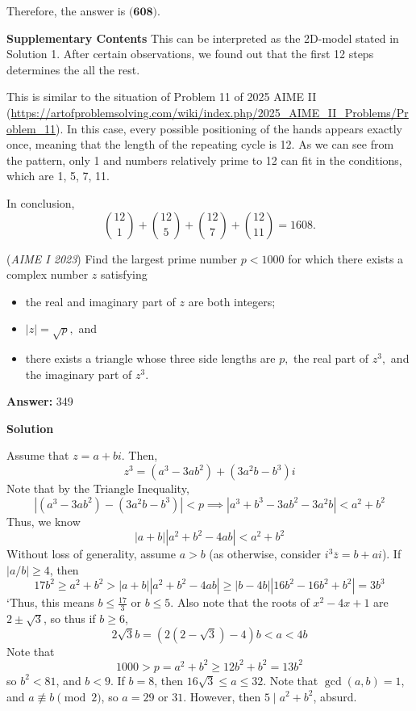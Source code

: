\begin{enumerate}
{{ Therefore, the answer is $\boxed{\textbf{(608)}}$.

 \textbf{Supplementary Contents} This can be interpreted as the 2D-model stated in Solution 1. After certain observations, we found out that the first 12 steps determines the all the rest.

 This is similar to the situation of Problem 11 of 2025 AIME II (\href{https://artofproblemsolving.com/wiki/index.php/2025\_AIME\_II\_Problems/Problem\_11}{https://artofproblemsolving.com/wiki/index.php/2025\_AIME\_II\_Problems/Problem\_11}). In this case, every possible positioning of the hands appears exactly once, meaning that the length of the repeating cycle is 12. As we can see from the pattern, only 1 and numbers relatively prime to 12 can fit in the conditions, which are 1, 5, 7, 11.

 In conclusion,
 \[{12\choose1}+{12\choose5}+{12\choose7}+{12\choose11}=1\boxed{608}.\]



	\item (\textit{AIME I 2023}) Find the largest prime number $p<1000$ for which there exists a complex number $z$ satisfying


 
            \begin{itemize}
        \item the real and imaginary part of $z$ are both integers;
            \end{itemize}
            
            \begin{itemize}
        \item $|z|=\sqrt{p},$ and
            \end{itemize}
            
            \begin{itemize}
        \item there exists a triangle whose three side lengths are $p,$ the real part of $z^{3},$ and the imaginary part of $z^{3}.$
            \end{itemize}
            
 \textbf{Answer: }349



\textbf{Solution}

Assume that $z=a+bi$. Then,
 \[z^3=(a^3-3ab^2)+(3a^2b-b^3)i\]Note that by the Triangle Inequality,
 \[|(a^3-3ab^2)-(3a^2b-b^3)|<p\implies |a^3+b^3-3ab^2-3a^2b|<a^2+b^2\]Thus, we know
 \[|a+b||a^2+b^2-4ab|<a^2+b^2\]Without loss of generality, assume $a>b$ (as otherwise, consider $i^3\overline z=b+ai$). If $|a/b|\geq 4$, then
 \[17b^2\geq a^2+b^2>|a+b||a^2+b^2-4ab|\geq |b-4b||16b^2-16b^2+b^2|=3b^3\]`Thus, this means $b\leq\frac{17}3$ or $b\leq 5$. Also note that the roots of $x^2-4x+1$ are $2\pm\sqrt 3$, so thus if $b\geq 6$,
 \[2\sqrt 3b=(2(2-\sqrt 3)-4)b<a<4b\]Note that
 \[1000>p=a^2+b^2\geq 12b^2+b^2=13b^2\]so $b^2<81$, and $b<9$. If $b=8$, then $16\sqrt 3\leq a\leq 32$. Note that $\gcd(a,b)=1$, and $a\not\equiv b\pmod 2$, so $a=29$ or $31$. However, then $5\mid a^2+b^2$, absurd.

}}
\end{enumerate}
